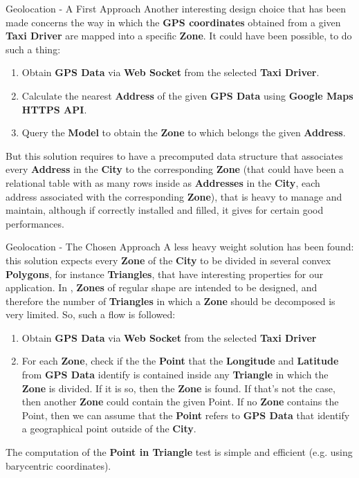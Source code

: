 \documentclass{../common/latex_classes/pdf_presentation}
\begin{document}
	\begin{frame}{Geolocation - A First Approach}
		Another interesting design choice that has been made concerns the way in which the \textbf{GPS coordinates} obtained from a given \textbf{Taxi Driver} are mapped into a specific \textbf{Zone}.
		It could have been possible, to do such a thing:
		\begin{enumerate}
			\item Obtain \textbf{GPS Data} via \textbf{Web Socket} from the selected \textbf{Taxi Driver}.
			\item Calculate the nearest \textbf{Address} of the given \textbf{GPS Data} using \textbf{Google Maps HTTPS API}.
			\item Query the \textbf{Model} to obtain the \textbf{Zone} to which belongs the given \textbf{Address}.
		\end{enumerate}
		But this solution requires to have a precomputed data structure that associates every \textbf{Address} in the \textbf{City} to the corresponding \textbf{Zone} (that could have been a relational table with as many rows inside as \textbf{Addresses} in the \textbf{City}, each address associated with the corresponding \textbf{Zone}), that is heavy to manage and maintain, although if correctly installed and filled, it gives for certain good performances.
	\end{frame}

	\begin{frame}{Geolocation - The Chosen Approach}
		A less heavy weight solution has been found: this solution expects every \textbf{Zone} of the \textbf{City} to be divided in several convex \textbf{Polygons}, for instance \textbf{Triangles}, that have interesting properties for our application.
		In \myTaxiService{}, \textbf{Zones} of regular shape are intended to be designed, and therefore the number of \textbf{Triangles} in which a \textbf{Zone} should be decomposed is very limited.
		So, such a flow is followed:
		\begin{enumerate}
			\item Obtain \textbf{GPS Data} via \textbf{Web Socket} from the selected \textbf{Taxi Driver}
			\item For each \textbf{Zone}, check if the the \textbf{Point} that the \textbf{Longitude} and \textbf{Latitude} from \textbf{GPS Data} identify is contained inside any \textbf{Triangle} in which the \textbf{Zone} is divided. If it is so, then the \textbf{Zone} is found. If that's not the case, then another \textbf{Zone} could contain the given Point. If no \textbf{Zone} contains the Point, then we can assume that the \textbf{Point} refers to \textbf{GPS Data} that identify a geographical point outside of the \textbf{City}.
		\end{enumerate}
		The computation of the \textbf{Point in Triangle} test is simple and efficient (e.g. using barycentric coordinates).
	\end{frame}
	
\end{document}
